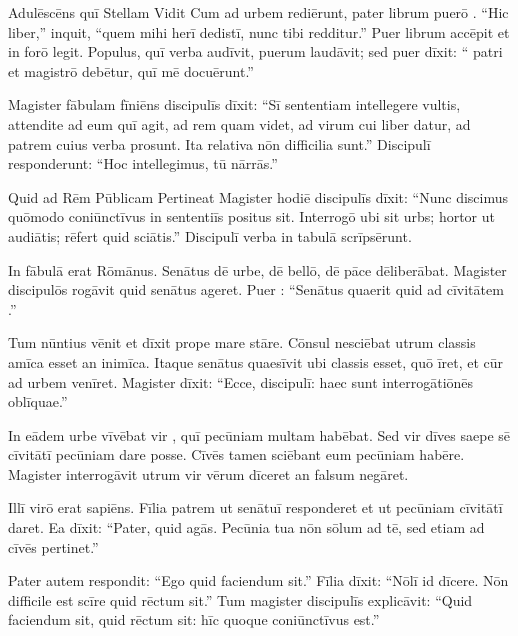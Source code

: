\documentclass[12pt]{nextbook}
\begin{document}
\begin{readersection}{Adulēscēns quī Stellam Vidit}
Cum ad urbem rediērunt, pater librum puerō . “Hic liber,” inquit, “quem mihi herī dedistī, nunc tibi redditur.” Puer librum accēpit et in forō legit. Populus, quī verba audīvit, puerum laudāvit; sed puer dīxit: “ patri et magistrō debētur, quī mē docuērunt.”

Magister fābulam fīniēns discipulīs dīxit: “Sī sententiam intellegere vultis, attendite ad eum quī agit, ad rem quam videt, ad virum cui liber datur, ad patrem cuius verba prosunt. Ita relativa nōn difficilia sunt.” Discipulī responderunt: “Hoc  intellegimus,  tū nārrās.”

\end{readersection}

\begin{readersection}{Quid ad Rēm Pūblicam Pertineat}
Magister hodiē discipulīs dīxit: “Nunc discimus quōmodo coniūnctīvus in sententiīs positus sit. Interrogō ubi sit urbs; hortor ut audiātis; rēfert quid sciātis.” Discipulī verba in tabulā scrīpsērunt.

In fābulā erat  Rōmānus. Senātus dē urbe, dē bellō, dē pāce dēliberābat. Magister discipulōs rogāvit quid senātus ageret. Puer : “Senātus quaerit quid ad cīvitātem .”

Tum nūntius vēnit et dīxit  prope mare stāre. Cōnsul nesciēbat utrum classis amīca esset an inimīca. Itaque senātus quaesīvit ubi classis esset, quō īret, et cūr ad urbem venīret. Magister dīxit: “Ecce, discipulī: haec sunt interrogātiōnēs oblīquae.”

In eādem urbe vīvēbat vir , quī pecūniam multam habēbat. Sed vir dīves saepe  sē cīvitātī pecūniam dare posse. Cīvēs tamen sciēbant eum pecūniam habēre. Magister interrogāvit utrum vir vērum dīceret an falsum negāret.

Illī virō erat  sapiēns. Fīlia patrem  ut senātuī responderet et ut pecūniam cīvitātī daret. Ea dīxit: “Pater,  quid agās. Pecūnia tua nōn sōlum ad tē, sed etiam ad cīvēs pertinet.”

Pater autem respondit: “Ego  quid faciendum sit.” Fīlia dīxit: “Nōlī id dīcere. Nōn difficile est scīre quid rēctum sit.” Tum magister discipulīs explicāvit: “Quid faciendum sit, quid rēctum sit: hīc quoque coniūnctīvus est.”


\end{readersection}
\end{document}
